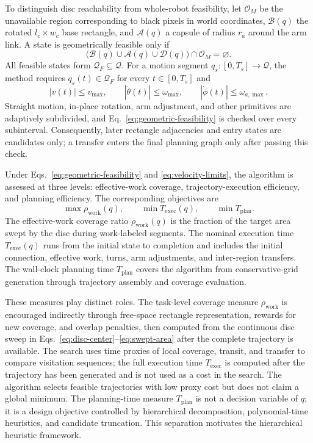 To distinguish disc reachability from whole-robot feasibility, let $\mathcal O_M$ be the unavailable region corresponding to black pixels in world coordinates, $\mathcal B(q)$ the rotated $l_c\times w_c$ base rectangle, and $\mathcal A(q)$ a capsule of radius $r_a$ around the arm link. A state is geometrically feasible only if
\begin{equation}
\bigl(\mathcal B(q)\cup\mathcal A(q)\cup\mathcal D(q)\bigr)\cap\mathcal O_M=\varnothing.
\tag{3a}
\label{eq:geometric-feasibility}
\end{equation}
All feasible states form $\mathcal Q_F\subseteq\mathcal Q$. For a motion segment $q_s:[0,T_s]\rightarrow\mathcal Q$, the method requires $q_s(t)\in\mathcal Q_F$ for every $t\in[0,T_s]$ and
\begin{equation}
|v(t)|\le v_{\max},\qquad
|\dot\theta(t)|\le\omega_{\max},\qquad
|\dot\phi(t)|\le\omega_{a,\max}.
\tag{3b}
\label{eq:velocity-limits}
\end{equation}
Straight motion, in-place rotation, arm adjustment, and other primitives are adaptively subdivided, and Eq.~\eqref{eq:geometric-feasibility} is checked over every subinterval. Consequently, later rectangle adjacencies and entry states are candidates only; a transfer enters the final planning graph only after passing this check.

Under Eqs.~\eqref{eq:geometric-feasibility} and \eqref{eq:velocity-limits}, the algorithm is assessed at three levels: effective-work coverage, trajectory-execution efficiency, and planning efficiency. The corresponding objectives are
\begin{equation}
\max \rho_{\mathrm{work}}(q),\qquad
\min T_{\mathrm{exec}}(q),\qquad
\min T_{\mathrm{plan}}.
\tag{4}
\label{eq:objectives}
\end{equation}
The effective-work coverage ratio $\rho_{\mathrm{work}}(q)$ is the fraction of the target area swept by the disc during work-labeled segments. The nominal execution time $T_{\mathrm{exec}}(q)$ runs from the initial state to completion and includes the initial connection, effective work, turns, arm adjustments, and inter-region transfers. The wall-clock planning time $T_{\mathrm{plan}}$ covers the algorithm from conservative-grid generation through trajectory assembly and coverage evaluation.

These measures play distinct roles. The task-level coverage measure $\rho_{\mathrm{work}}$ is encouraged indirectly through free-space rectangle representation, rewards for new coverage, and overlap penalties, then computed from the continuous disc sweep in Eqs.~\eqref{eq:disc-center}--\eqref{eq:swept-area} after the complete trajectory is available. The search uses time proxies of local coverage, transit, and transfer to compare visitation sequences; the full execution time $T_{\mathrm{exec}}$ is computed after the trajectory has been generated and is not used as a cost in the search. The algorithm selects feasible trajectories with low proxy cost but does not claim a global minimum. The planning-time measure $T_{\mathrm{plan}}$ is not a decision variable of $q$; it is a design objective controlled by hierarchical decomposition, polynomial-time heuristics, and candidate truncation. This separation motivates the hierarchical heuristic framework.

